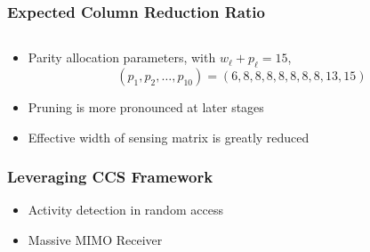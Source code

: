 \begin{frame}
\frametitle{Expected Column Reduction Ratio}
\begin{columns}
  \centerline{\scalebox{0.9}{}}
  \centerline{}
\end{columns}
\begin{itemize}
\item Parity allocation parameters, with $w_{\ell} + p_{\ell} = 15$,
\begin{equation*}
(p_1, p_2, \ldots, p_{10}) = (6, 8, 8, 8, 8, 8, 8, 8, 13, 15)
\end{equation*}
\item Pruning is more pronounced at later stages
\item Effective width of sensing matrix is greatly reduced
\end{itemize}
\end{frame}


\begin{frame}
\frametitle{Leveraging CCS Framework}
\begin{center}
\end{center}
  \begin{itemize}
  \item Activity detection in random access
  \item Massive MIMO Receiver
  \end{itemize}
\end{frame}


